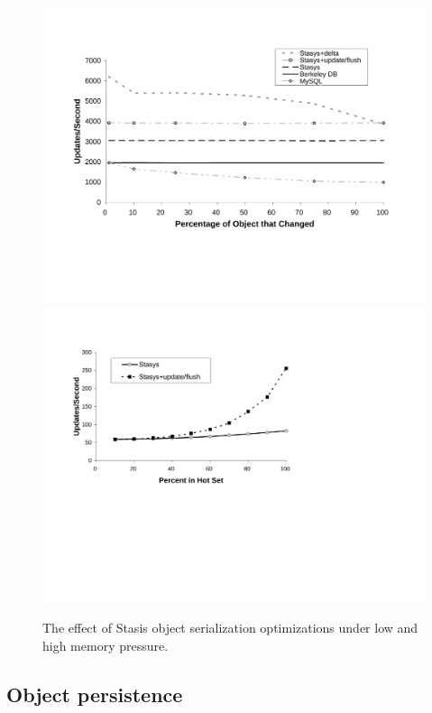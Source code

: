 \documentclass[letterpaper,twocolumn,10pt]{article}
\newcommand{\yad}{Stasis\xspace}
\begin{document}
\begin{figure}
\includegraphics[width=1\columnwidth]{figs/object-diff.pdf}
\hspace{.2in}
\includegraphics[width=1\columnwidth]{figs/mem-pressure.pdf}
\vspace{-.15in}
\caption{\sf \label{fig:OASYS}
The effect of \yad object serialization optimizations under low and high memory pressure.}
\end{figure}


\subsection{Object persistence}
\label{sec:oasys}
\end{document}
